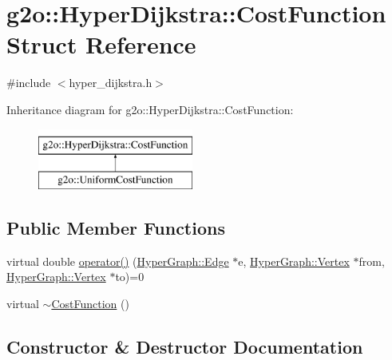\hypertarget{structg2o_1_1_hyper_dijkstra_1_1_cost_function}{}\section{g2o\+:\+:Hyper\+Dijkstra\+:\+:Cost\+Function Struct Reference}
\label{structg2o_1_1_hyper_dijkstra_1_1_cost_function}


{\ttfamily \#include $<$hyper\+\_\+dijkstra.\+h$>$}

Inheritance diagram for g2o\+:\+:Hyper\+Dijkstra\+:\+:Cost\+Function\+:\begin{figure}[H]
\begin{center}
\leavevmode
\includegraphics[height=2.000000cm]{structg2o_1_1_hyper_dijkstra_1_1_cost_function}
\end{center}
\end{figure}
\subsection*{Public Member Functions}
\begin{DoxyCompactItemize}
\item 
virtual double \mbox{\hyperlink{structg2o_1_1_hyper_dijkstra_1_1_cost_function_a6d30ca80400c75941851ae079cfd42fd}{operator()}} (\mbox{\hyperlink{classg2o_1_1_hyper_graph_1_1_edge}{Hyper\+Graph\+::\+Edge}} $\ast$e, \mbox{\hyperlink{classg2o_1_1_hyper_graph_1_1_vertex}{Hyper\+Graph\+::\+Vertex}} $\ast$from, \mbox{\hyperlink{classg2o_1_1_hyper_graph_1_1_vertex}{Hyper\+Graph\+::\+Vertex}} $\ast$to)=0
\item 
virtual \mbox{\hyperlink{structg2o_1_1_hyper_dijkstra_1_1_cost_function_aabfa53ac04d3934478fe419695474bcf}{$\sim$\+Cost\+Function}} ()
\end{DoxyCompactItemize}


\subsection{Constructor \& Destructor Documentation}
\mbox{\label{structg2o_1_1_hyper_dijkstra_1_1_cost_function_aabfa53ac04d3934478fe419695474bcf}} 
